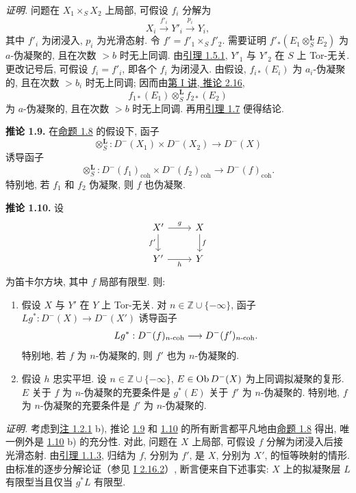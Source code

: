 \emph{证明.} 问题在 \(X_1\times_SX_2\) 上局部, 可假设 \(f_i\) 分解为
\[
  X_i\xrightarrow{f'_i}Y'_i\xrightarrow{p_i}Y_i,
\]
其中 \(f'_i\) 为闭浸入, \(p_i\) 为光滑态射. 令 \(f'=f'_1\times_Sf'_2\). 需要证明 \(f'_*(E_1\otimes_S^{\mathbf L}E_2)\) 为 \(a\)-伪凝聚的, 且在次数 \(>b\) 时无上同调. 由\hyperlink{sga6.e03.lem.1-5-1}{引理 1.5.1}, \(Y'_1\) 与 \(Y'_2\) 在 \(S\) 上 Tor-无关. 更改记号后, 可假设 \(f_i=f'_i\), 即各个 \(f_i\) 为闭浸入. 由假设, \(f_{i*}(E_i)\) 为 \(a_i\)-伪凝聚的, 且在次数 \(>b_i\) 时无上同调; 因而由\hyperlink{sga6.e01.cor.2-16}{第 I 讲, 推论 2.16},
\[
  f_{1*}(E_1)\otimes_S^{\mathbf L}f_{2*}(E_2)
\]
为 \(a\)-伪凝聚的, 且在次数 \(>b\) 时无上同调. 再用\hyperlink{sga6.e03.lem.1-7}{引理 1.7} 便得结论.

\textbf{推论 1.9.} 在\hyperlink{sga6.e03.prop.1-8}{命题 1.8} 的假设下, 函子
\[
  \otimes_S^{\mathbf L}:D^{-}(X_1)\times D^{-}(X_2)\longrightarrow D^{-}(X)
\]
诱导函子
\[
  \otimes_S^{\mathbf L}:D^{-}(f_1)_{\mathrm{coh}}\times D^{-}(f_2)_{\mathrm{coh}}
  \longrightarrow D^{-}(f)_{\mathrm{coh}} .
\]
特别地, 若 \(f_1\) 和 \(f_2\) 伪凝聚, 则 \(f\) 也伪凝聚.

\textbf{推论 1.10.} 设
\[
\begin{tikzcd}
X' \arrow[r,"g"] \arrow[d,"f'"'] & X \arrow[d,"f"]\\
Y' \arrow[r,"h"'] & Y
\end{tikzcd}
\]
为笛卡尔方块, 其中 \(f\) 局部有限型. 则:
\begin{enumerate}[label=\alph*)]
\item 假设 \(X\) 与 \(Y'\) 在 \(Y\) 上 Tor-无关. 对 \(n\in\mathbb Z\cup\{-\infty\}\), 函子 \(Lg^*:D^{-}(X)\to D^{-}(X')\) 诱导函子
\[
  Lg^*:D^{-}(f)_{n\text{-}\mathrm{coh}}\longrightarrow D^{-}(f')_{n\text{-}\mathrm{coh}}.
\]
特别地, 若 \(f\) 为 \(n\)-伪凝聚的, 则 \(f'\) 也为 \(n\)-伪凝聚的.

\item 假设 \(h\) 忠实平坦. 设 \(n\in\mathbb Z\cup\{-\infty\}\), \(E\in\operatorname{Ob} D^{-}(X)\) 为上同调拟凝聚的复形. \(E\) 关于 \(f\) 为 \(n\)-伪凝聚的充要条件是 \(g^*(E)\) 关于 \(f'\) 为 \(n\)-伪凝聚的. 特别地, \(f\) 为 \(n\)-伪凝聚的充要条件是 \(f'\) 为 \(n\)-伪凝聚的.
\end{enumerate}

\emph{证明.} 考虑到\hyperlink{sga6.e03.rem.1-2-1}{注 1.2.1} b), 推论 \hyperlink{sga6.e03.cor.1-9}{1.9} 和 \hyperlink{sga6.e03.cor.1-10}{1.10} 的所有断言都平凡地由\hyperlink{sga6.e03.prop.1-8}{命题 1.8} 得出, 唯一例外是 \hyperlink{sga6.e03.cor.1-10}{1.10} b) 的充分性. 对此, 问题在 \(X\) 上局部, 可假设 \(f\) 分解为闭浸入后接光滑态射. 由\hyperlink{sga6.e03.lem.1-1-3}{引理 1.1.3}, 归结为 \(f\), 分别为 \(f'\), 是 \(X\), 分别为 \(X'\), 的恒等映射的情形. 由标准的逐步分解论证（参见 \hyperlink{sga6.e01.exercise.2-16-2}{I 2.16.2}）, 断言便来自下述事实: \(X\) 上的拟凝聚层 \(L\) 有限型当且仅当 \(g^*L\) 有限型.


